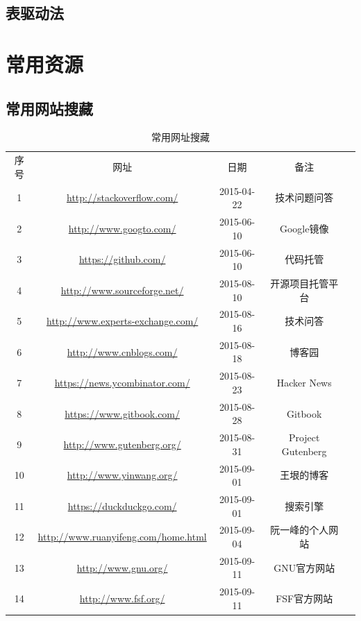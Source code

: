 \documentclass{book}
\begin{document}
\subsection{表驱动法}




\section{常用资源}

\subsection{常用网站搜藏}

\begin{longtable}{|c|c|c|c|c|}
	\caption{常用网址搜藏}\\
	\hline
	\multirow{1}{*}{序号}
	& \multicolumn{1}{c|}{网址}  
	& \multicolumn{1}{c|}{日期} 
	& \multicolumn{1}{c|}{备注}\\			
	\cline{1-4}
	1 & \url{http://stackoverflow.com/} & 2015-04-22 & 技术问题问答\\
	\hline
	2 & \url{http://www.googto.com/} & 2015-06-10 & Google镜像\\
	\hline
	3 & \url{https://github.com/} & 2015-06-10 & 代码托管\\
	\hline
	4 & \url{http://www.sourceforge.net/} & 2015-08-10 & 开源项目托管平台\\
	\hline
	5 & \url{http://www.experts-exchange.com/} & 2015-08-16 & 技术问答\\
	\hline
	6 & \url{http://www.cnblogs.com/} & 2015-08-18 & 博客园\\
	\hline
	7 & \url{https://news.ycombinator.com/} & 2015-08-23 & Hacker News\\
	\hline
	8 & \url{https://www.gitbook.com/} & 2015-08-28 & Gitbook\\
	\hline
	9 & \url{http://www.gutenberg.org/} & 2015-08-31 & Project Gutenberg\\
	\hline
	10 & \url{http://www.yinwang.org/} & 2015-09-01 & 王垠的博客\\
	\hline
	11 & \url{https://duckduckgo.com/} & 2015-09-01 & 搜索引擎\\
	\hline
	12 & \url{http://www.ruanyifeng.com/home.html} & 2015-09-04 & 阮一峰的个人网站\\
	\hline
	13 & \url{http://www.gnu.org/} & 2015-09-11 & GNU官方网站\\
	\hline
	14 & \url{http://www.fsf.org/} & 2015-09-11 & FSF官方网站\\

\end{longtable}
\end{document}
